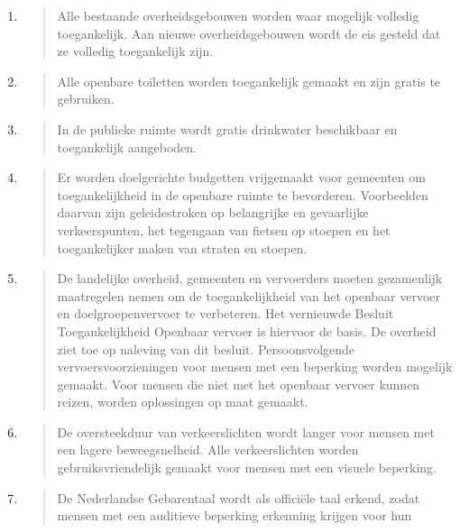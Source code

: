 \begin{enumerate}
\def\labelenumi{\arabic{enumi}.}
\item
  \begin{quote}
  Alle bestaande overheidsgebouwen worden waar mogelijk volledig
  toegankelijk. Aan nieuwe overheidsgebouwen wordt de eis gesteld dat ze
  volledig toegankelijk zijn.
  \end{quote}
\item
  \begin{quote}
  Alle openbare toiletten worden toegankelijk gemaakt en zijn gratis te
  gebruiken.
  \end{quote}
\item
  \begin{quote}
  In de publieke ruimte wordt gratis drinkwater beschikbaar en
  toegankelijk aangeboden.
  \end{quote}
\item
  \begin{quote}
  Er worden doelgerichte budgetten vrijgemaakt voor gemeenten om
  toegankelijkheid in de openbare ruimte te bevorderen. Voorbeelden
  daarvan zijn geleidestroken op belangrijke en gevaarlijke
  verkeerspunten, het tegengaan van fietsen op stoepen en het
  toegankelijker maken van straten en stoepen.
  \end{quote}
\item
  \begin{quote}
  De landelijke overheid, gemeenten en vervoerders moeten gezamenlijk
  maatregelen nemen om de toegankelijkheid van het openbaar vervoer en
  doelgroepenvervoer te verbeteren. Het vernieuwde Besluit
  Toegankelijkheid Openbaar vervoer is hiervoor de basis. De overheid
  ziet toe op naleving van dit besluit. Persoonsvolgende
  vervoersvoorzieningen voor mensen met een beperking worden mogelijk
  gemaakt. Voor mensen die niet met het openbaar vervoer kunnen reizen,
  worden oplossingen op maat gemaakt.
  \end{quote}
\item
  \begin{quote}
  De oversteekduur van verkeerslichten wordt langer voor mensen met een
  lagere beweegsnelheid. Alle verkeerslichten worden gebruiksvriendelijk
  gemaakt voor mensen met een visuele beperking.
  \end{quote}
\item
  \begin{quote}
  De Nederlandse Gebarentaal wordt als officiële taal erkend, zodat
  mensen met een auditieve beperking erkenning krijgen voor hun

\end{quote}
\end{enumerate}
